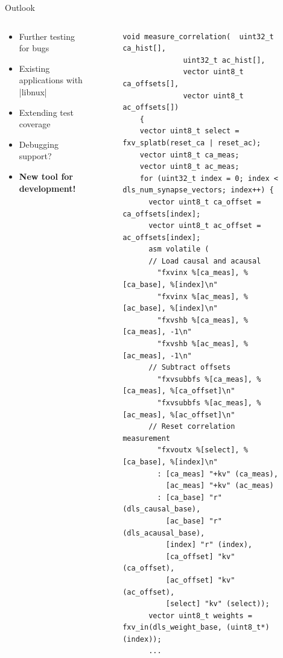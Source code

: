 \documentclass[10pt,aspectratio=169]{beamer}
\begin{document}
\begin{frame}[fragile]{Outlook}
    \begin{columns}[c]
    \begin{column}{0.5\textwidth}
        \begin{itemize}
			\setlength\itemsep{1em}
			\item Further testing for bugs
			\item Existing applications with |libnux|
			\item Extending test coverage
			\item Debugging support?
			\item \textbf{New tool for development!}
        \end{itemize}
    \end{column}

    \begin{column}{0.5\textwidth}
        \centering
        \begin{figure}
            \begin{adjustbox}{center, max width={\columnwidth}}
			\begin{lstlisting}[basicstyle=\ttfamily\tiny\color{darkblue}]
void measure_correlation(  uint32_t ca_hist[],
              uint32_t ac_hist[],
              vector uint8_t ca_offsets[],
              vector uint8_t ac_offsets[])
    {
    vector uint8_t select = fxv_splatb(reset_ca | reset_ac);
    vector uint8_t ca_meas;
    vector uint8_t ac_meas;
    for (uint32_t index = 0; index < dls_num_synapse_vectors; index++) {
      vector uint8_t ca_offset = ca_offsets[index];
      vector uint8_t ac_offset = ac_offsets[index];
      asm volatile (
      // Load causal and acausal
        "fxvinx %[ca_meas], %[ca_base], %[index]\n"
        "fxvinx %[ac_meas], %[ac_base], %[index]\n"
        "fxvshb %[ca_meas], %[ca_meas], -1\n"
        "fxvshb %[ac_meas], %[ac_meas], -1\n"
      // Subtract offsets
        "fxvsubbfs %[ca_meas], %[ca_meas], %[ca_offset]\n"
        "fxvsubbfs %[ac_meas], %[ac_meas], %[ac_offset]\n"
      // Reset correlation measurement
        "fxvoutx %[select], %[ca_base], %[index]\n"
        : [ca_meas] "+kv" (ca_meas),
          [ac_meas] "+kv" (ac_meas)
        : [ca_base] "r" (dls_causal_base),
          [ac_base] "r" (dls_acausal_base),
          [index] "r" (index),
          [ca_offset] "kv" (ca_offset),
          [ac_offset] "kv" (ac_offset),
          [select] "kv" (select));
      vector uint8_t weights = fxv_in(dls_weight_base, (uint8_t*)(index));
	  ...
			\end{lstlisting}
            \end{adjustbox}
        \end{figure}
    \end{column}
    \end{columns}
\end{frame}
\end{document}
